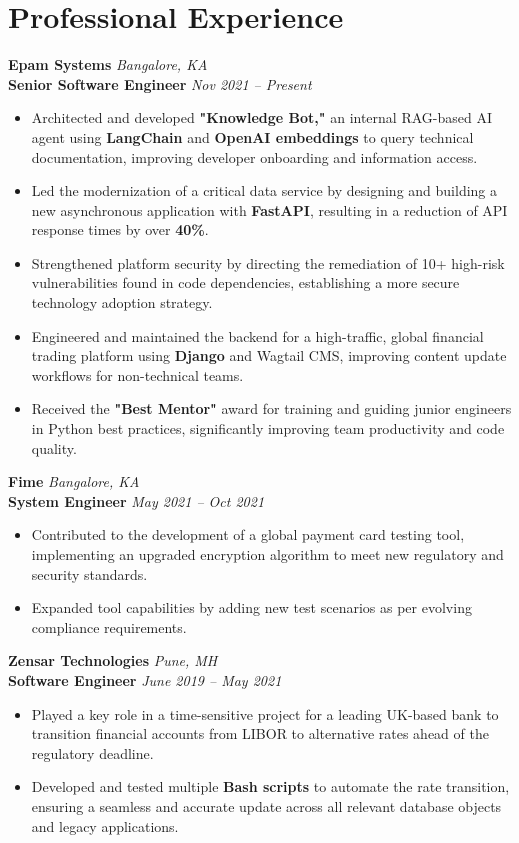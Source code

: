 \documentclass[10pt, a4paper]{article}
\newcommand{\resumeEntry}[4]{
  \vspace{1ex}
  \noindent\textbf{#1} \hfill \textit{#2} \\
  \noindent\textbf{#3} \hfill \textit{#4}
  \begin{itemize}[leftmargin=*, nosep, itemsep=0.5ex]
}
\newcommand{\resumeEntryEnd}{\end{itemize}\vspace{0.5ex}}
\newcommand{\resumeItem}[1]{\item\small{#1}}
\begin{document}
\section{Professional Experience}

\resumeEntry{Epam Systems}{Bangalore, KA}{Senior Software Engineer}{Nov 2021 – Present}
    \resumeItem{Architected and developed \textbf{"Knowledge Bot,"} an internal RAG-based AI agent using \textbf{LangChain} and \textbf{OpenAI embeddings} to query technical documentation, improving developer onboarding and information access.}
    \resumeItem{Led the modernization of a critical data service by designing and building a new asynchronous application with \textbf{FastAPI}, resulting in a reduction of API response times by over \textbf{40\%}.}
    \resumeItem{Strengthened platform security by directing the remediation of 10+ high-risk vulnerabilities found in code dependencies, establishing a more secure technology adoption strategy.}
    \resumeItem{Engineered and maintained the backend for a high-traffic, global financial trading platform using \textbf{Django} and Wagtail CMS, improving content update workflows for non-technical teams.}
    \resumeItem{Received the \textbf{"Best Mentor"} award for training and guiding junior engineers in Python best practices, significantly improving team productivity and code quality.}
\resumeEntryEnd

\resumeEntry{Fime}{Bangalore, KA}{System Engineer}{May 2021 – Oct 2021}
    \resumeItem{Contributed to the development of a global payment card testing tool, implementing an upgraded encryption algorithm to meet new regulatory and security standards.}
    \resumeItem{Expanded tool capabilities by adding new test scenarios as per evolving compliance requirements.}
\resumeEntryEnd

\resumeEntry{Zensar Technologies}{Pune, MH}{Software Engineer}{June 2019 – May 2021}
    \resumeItem{Played a key role in a time-sensitive project for a leading UK-based bank to transition financial accounts from LIBOR to alternative rates ahead of the regulatory deadline.}
    \resumeItem{Developed and tested multiple \textbf{Bash scripts} to automate the rate transition, ensuring a seamless and accurate update across all relevant database objects and legacy applications.}
\resumeEntryEnd

\end{document}
